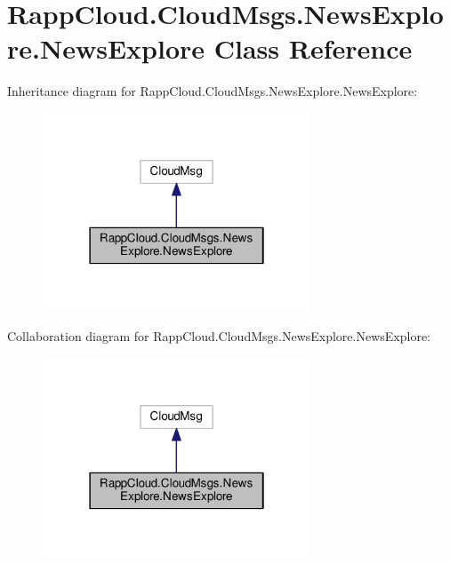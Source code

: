 \hypertarget{classRappCloud_1_1CloudMsgs_1_1NewsExplore_1_1NewsExplore}{\section{Rapp\-Cloud.\-Cloud\-Msgs.\-News\-Explore.\-News\-Explore Class Reference}
\label{classRappCloud_1_1CloudMsgs_1_1NewsExplore_1_1NewsExplore}
}


Inheritance diagram for Rapp\-Cloud.\-Cloud\-Msgs.\-News\-Explore.\-News\-Explore\-:
\nopagebreak
\begin{figure}[H]
\begin{center}
\leavevmode
\includegraphics[width=226pt]{classRappCloud_1_1CloudMsgs_1_1NewsExplore_1_1NewsExplore__inherit__graph}
\end{center}
\end{figure}


Collaboration diagram for Rapp\-Cloud.\-Cloud\-Msgs.\-News\-Explore.\-News\-Explore\-:
\nopagebreak
\begin{figure}[H]
\begin{center}
\leavevmode
\includegraphics[width=226pt]{classRappCloud_1_1CloudMsgs_1_1NewsExplore_1_1NewsExplore__coll__graph}
\end{center}
\end{figure}
